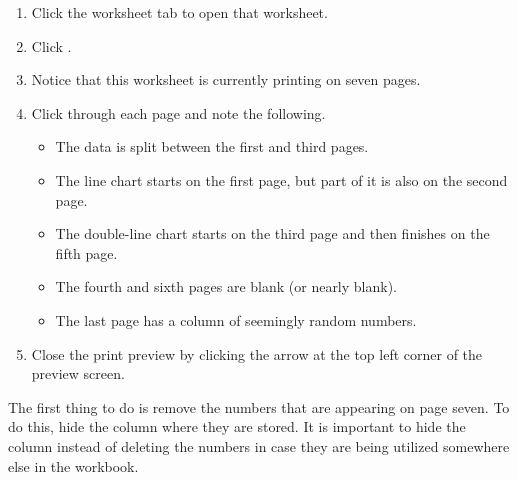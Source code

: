 \begin{enumbox}
	\begin{enumerate}
		\item Click the  worksheet tab to open that worksheet.
		\item Click .
		\item Notice that this worksheet is currently printing on seven pages.
		\item Click through each page and note the following.
	
		\begin{itemize}
			\item The data is split between the first and third pages.
			\item The line chart starts on the first page, but part of it is also on the second page.
			\item The double-line chart starts on the third page and then finishes on the fifth page.
			\item The fourth and sixth pages are blank (or nearly blank).
			\item The last page has a column of seemingly random numbers.
		\end{itemize}
	
		\item Close the print preview by clicking the arrow at the top left corner of the preview screen.
	\end{enumerate}
\end{enumbox}
	
The first thing to do is remove the numbers that are appearing on page seven. To do this, hide the column where they are stored. It is important to hide the column instead of deleting the numbers in case they are being utilized somewhere else in the workbook.

